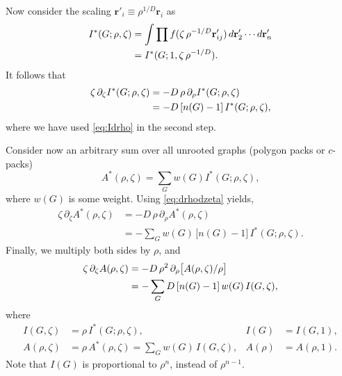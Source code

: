\documentclass[aip,jcp,reprint,superscriptaddress]{revtex4-1}
\newcommand{\vct}[1]{\mathbf{#1}}
\providecommand{\vr}{} %
\renewcommand{\vr}{\vct{r}}
\begin{document}
Now consider the scaling
$\vr'_i \equiv \rho^{1/D} \vr_i$
as
\begin{align*}
  I^*(G; \rho, \zeta)
&= \int \prod f(\zeta \, \rho^{-1/D} \vr'_{ij})
        \, d\vr'_2 \cdots d\vr'_n
  \notag \\
&= I^*(G; 1, \zeta \, \rho^{-1/D}).
\end{align*}
%
It follows that
\begin{align}
 \zeta \, \partial_\zeta I^*(G; \rho, \zeta)
&= -D \, \rho \, \partial_\rho I^*(G; \rho, \zeta) \notag \\
&= -D \, [n(G) - 1] \, I^*(G; \rho, \zeta),
\label{eq:drhodzeta}
\end{align}
where we have used \eqref{eq:Idrho} in the second step.


Consider now an arbitrary sum over all unrooted graphs (polygon packs or $c$-packs)
\[
  A^*(\rho, \zeta) = \sum_G w(G) I^*(G; \rho, \zeta),
\]
where $w(G)$ is some weight.
%
Using \eqref{eq:drhodzeta} yields,
\begin{align*}
  \zeta \, \partial_\zeta A^*(\rho, \zeta)
&=
  -D \, \rho \, \partial_\rho A^*(\rho, \zeta)
  \\
&=
  -\sum_G w(G) \, \bigl[ n(G) - 1 \bigr] \, I^*(G; \rho, \zeta).
\end{align*}
%
Finally, we multiply both sides by $\rho$, and
%
\begin{align}
  \zeta \, \partial_\zeta A(\rho, \zeta) %
  &= -D \, \rho^2 \, \partial_\rho \big[ A(\rho, \zeta)/\rho \big] \notag \\
  &= -\sum_G D \, [n(G) - 1] \, w(G) \, I(G, \zeta),
  \label{eq:virialtheorem}
\end{align}
where
\begin{align*}
  I(G, \zeta)    &= \rho \, I^*(G; \rho, \zeta), &
            I(G) &= I(G, 1), \\
  A(\rho, \zeta) &= \rho \, A^*(\rho, \zeta) = \sum_G w(G) \, I(G, \zeta), &
         A(\rho) &= A(\rho, 1).
\end{align*}
%
Note that
$I(G)$ is
proportional to $\rho^n$, instead of $\rho^{n-1}$.
\end{document}
